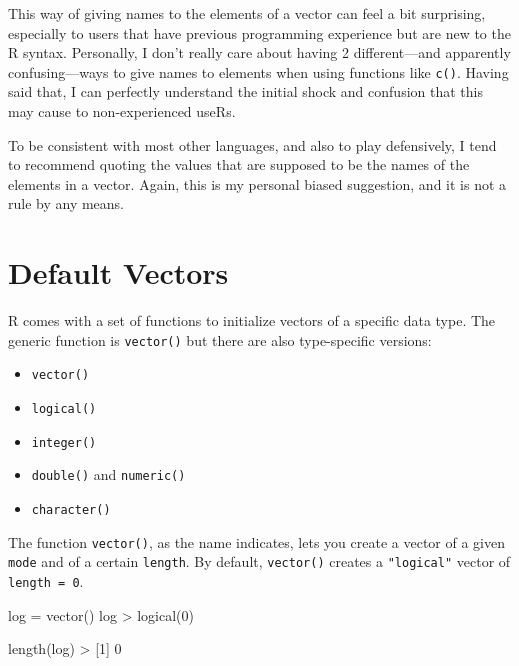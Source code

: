 \documentclass[
]{book}
\newenvironment{Shaded}{\begin{snugshade}}{\end{snugshade}}
\newcommand{\DecValTok}[1]{\textcolor[rgb]{0.00,0.00,0.81}{#1}}
\newcommand{\FunctionTok}[1]{\textcolor[rgb]{0.00,0.00,0.00}{#1}}
\newcommand{\NormalTok}[1]{#1}
\newcommand{\OtherTok}[1]{\textcolor[rgb]{0.56,0.35,0.01}{#1}}
\newcommand{\SpecialCharTok}[1]{\textcolor[rgb]{0.00,0.00,0.00}{#1}}
\begin{document}
This way of giving names to the elements of a vector can feel a bit surprising,
especially to users that have previous programming experience but are new to
the R syntax. Personally, I don't really care about having 2 different---and
apparently confusing---ways to give names to elements when using functions like
\texttt{c()}. Having said that, I can perfectly understand the initial shock and
confusion that this may cause to non-experienced useRs.

To be consistent with most other languages, and also to play defensively,
I tend to recommend quoting the values that are supposed to be the
names of the elements in a vector. Again, this is my personal biased
suggestion, and it is not a rule by any means.

\hypertarget{default-vectors}{%
\section{Default Vectors}\label{default-vectors}}

R comes with a set of functions to initialize vectors of a specific data type.
The generic function is \texttt{vector()} but there are also type-specific versions:

\begin{itemize}
\item
  \texttt{vector()}
\item
  \texttt{logical()}
\item
  \texttt{integer()}
\item
  \texttt{double()} and \texttt{numeric()}
\item
  \texttt{character()}
\end{itemize}

The function \texttt{vector()}, as the name indicates, lets you create a vector of
a given \texttt{mode} and of a certain \texttt{length}. By default, \texttt{vector()} creates a
\texttt{"logical"} vector of \texttt{length\ =\ 0}.

\begin{Shaded}
\begin{Highlighting}[]
\NormalTok{log }\OtherTok{=} \FunctionTok{vector}\NormalTok{()}
\NormalTok{log}
\SpecialCharTok{\textgreater{}} \FunctionTok{logical}\NormalTok{(}\DecValTok{0}\NormalTok{)}

\FunctionTok{length}\NormalTok{(log)}
\SpecialCharTok{\textgreater{}}\NormalTok{ [}\DecValTok{1}\NormalTok{] }\DecValTok{0}
\end{Highlighting}
\end{Shaded}
\end{document}
